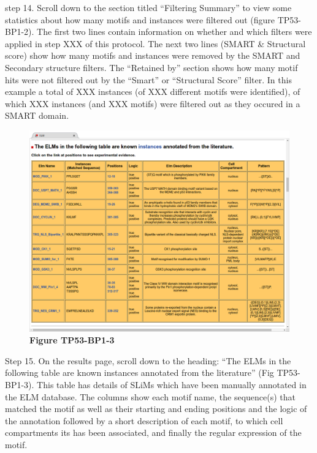 step 14. Scroll down to the section titled ``Filtering Summary'' to view
some statistics about how many motifs and instances were filtered out
(figure TP53-BP1-2). The first two lines contain information on whether
and which filters were applied in step XXX of this protocol. The next
two lines (SMART \& Structural score) show how many motifs and instances
were removed by the SMART and Secondary structure filters. The
``Retained by'' section shows how many motif hits were not filtered out
by the ``Smart'' or ``Structural Score'' filter. In this example a total
of XXX instances (of XXX different motifs were identified), of which XXX
instances (and XXX motifs) were filtered out as they occured in a SMART
domain.


\begin{figure}[h!]
\centering
\includegraphics[width=\textwidth]{Figures/TP53_1/elm_results_known.png} 
\caption{
\textbf{Figure TP53-BP1-3}
}
\end{figure}

Step 15. On the results page, scroll down to the heading: ``The ELMs in
the following table are known instances annotated from the literature''
(Fig TP53-BP1-3). This table has details of SLiMs which have been
manually annotated in the ELM database. The columns show each motif
name, the sequence(s) that matched the motif as well as their starting
and ending positions and the logic of the annotation followed by a short
description of each motif, to which cell compartments its has been
associated, and finally the regular expression of the motif.

